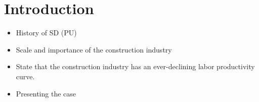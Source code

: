 
\chapter{Introduction}

\begin{itemize}
    \item History of SD (PU)
    \item Scale and importance of the construction industry
    \item State that the construction industry has an ever-declining labor productivity curve.
    \item Presenting the case
\end{itemize}

\cleardoublepage